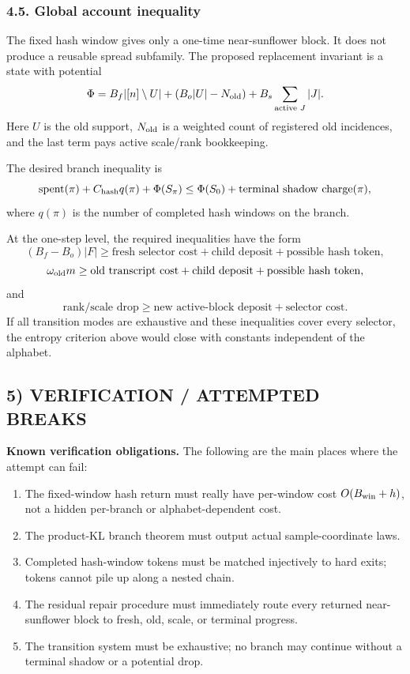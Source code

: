 \subsubsection*{4.5. Global account inequality}

The fixed hash window gives only a one-time near-sunflower block.  It does not
produce a reusable spread subfamily.  The proposed replacement invariant is a
state with potential
\[
  \Phi
  =
  B_f |[n]\setminus U|
  +(B_o|U|-N_{\rm old})
  +B_s\sum_{\text{active }J}|J|.
\]
Here $U$ is the old support, $N_{\rm old}$ is a weighted count of registered
old incidences, and the last term pays active scale/rank bookkeeping.

The desired branch inequality is
\[
  \operatorname{spent}(\pi)
  + C_{\rm hash}q(\pi)
  + \Phi(S_\pi)
  \le
  \Phi(S_0)+\operatorname{terminal\ shadow\ charge}(\pi),
\]
where $q(\pi)$ is the number of completed hash windows on the branch.

At the one-step level, the required inequalities have the form
\[
  (B_f-B_o)|F|
  \ge
  \text{fresh selector cost}+\text{child deposit}+\text{possible hash token},
\]
\[
  \omega_{\rm old}m
  \ge
  \text{old transcript cost}+\text{child deposit}+\text{possible hash token},
\]
and
\[
  \text{rank/scale drop}
  \ge
  \text{new active-block deposit}+\text{selector cost}.
\]
If all transition modes are exhaustive and these inequalities cover every
selector, the entropy criterion above would close with constants independent
of the alphabet.

\subsection{5) VERIFICATION / ATTEMPTED BREAKS}

\textbf{Known verification obligations.}
The following are the main places where the attempt can fail:
\begin{enumerate}
\item The fixed-window hash return must really have per-window cost
$O(B_{\rm win}+h)$, not a hidden per-branch or alphabet-dependent cost.
\item The product-KL branch theorem must output actual sample-coordinate laws.
\item Completed hash-window tokens must be matched injectively to hard exits;
tokens cannot pile up along a nested chain.
\item The residual repair procedure must immediately route every returned
near-sunflower block to fresh, old, scale, or terminal progress.
\item The transition system must be exhaustive; no branch may continue without
a terminal shadow or a potential drop.
\end{enumerate}

